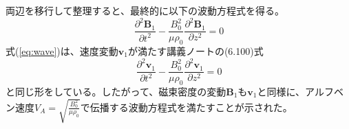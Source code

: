 \documentclass[autodetect-engine,11pt,a4paper]{bxjsarticle}
\begin{document}
両辺を移行して整理すると、最終的に以下の波動方程式を得る。
\begin{equation}
    \frac{\partial^{2}\bm{B}_{1}}{\partial t^{2}} - \frac{B_{0}^{2}}{\mu\rho_{0}}\frac{\partial^{2}\bm{B}_{1}}{\partial z^{2}} = 0 \label{eq:wave}
\end{equation}
式(\ref{eq:wave})は、速度変動$\bm{v}_1$が満たす講義ノートの(6.100)式
\begin{equation}
    \frac{\partial^{2}\bm{v}_{1}}{\partial t^{2}} - \frac{B_{0}^{2}}{\mu\rho_{0}}\frac{\partial^{2}\bm{v}_{1}}{\partial z^{2}} = 0
\end{equation}
と同じ形をしている。したがって、磁束密度の変動$\bm{B}_1$も$\bm{v}_1$と同様に、アルフベン速度$V_A = \sqrt{\frac{B_0^2}{\mu\rho_0}}$で伝播する波動方程式を満たすことが示された。
\end{document}
